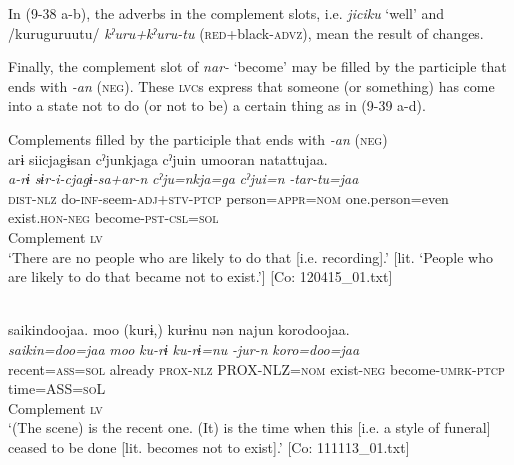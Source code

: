In (9-38 a-b), the adverbs in the complement slots, i.e. \textit{jiciku} ‘well’ and /kuruguruutu/ \textit{kˀuru+kˀuru-tu} (\textsc{red}+black-\textsc{advz}), mean the result of changes.

Finally, the complement slot of \textit{nar-} ‘become’ may be filled by the participle that ends with \textit{{}-an} (\textsc{neg}). These \textsc{lvc}s express that someone (or something) has come into a state not to do (or not to be) a certain thing as in (9-39 a-d).

\ea   Complements filled by the participle that ends with \textit{{}-an} (\textsc{neg}) \label{ex:9.39}
 \ea{}\\
    \gllll  arɨ  siicjagɨsan  cˀjunkjaga   cˀjuin  umooran  natattujaa.\\
      \textit{a-rɨ}  \textit{sɨr-i-cjagɨ-sa+ar-n}  \textit{cˀju=nkja=ga} \textit{cˀjui=n}  \textit{}  \textit{-tar-tu=jaa}\\
      \textsc{dist}-\textsc{nlz}  do-\textsc{inf}-seem-\textsc{adj}+\textsc{stv}-\textsc{ptcp}  person=\textsc{appr}=\textsc{nom}  one.person=even  exist.\textsc{hon}-\textsc{neg}  become-\textsc{pst}-\textsc{csl}=\textsc{sol}\\
          {}           {}       {}             {}       Complement  \textsc{lv}\\
      \glt       ‘There are no people who are likely to do that [i.e. recording].’ [lit. ‘People who are likely to do that became not to exist.’] [Co: 120415\_01.txt]

  \ex{}\\
    \gllll {\textbar}saikin{\textbar}doojaa.  {\textbar}moo{\textbar}  (kurɨ,)  kurɨnu  nən  najun  {\textbar}koro{\textbar}doojaa.\\
      \textit{saikin=doo=jaa}  \textit{moo}  \textit{ku-rɨ}  \textit{ku-rɨ=nu}  \textit{}  \textit{-jur-n}  \textit{koro=doo=jaa}\\
      recent=\textsc{ass}=\textsc{sol}  already  \textsc{prox}-\textsc{nlz}  PROX-NLZ=\textsc{nom}  exist-\textsc{neg}  become-\textsc{umrk}-\textsc{ptcp}  time=ASS=\textsc{so}L\\
          {}             {}        {}          {}          Complement  \textsc{lv} \\
      \glt ‘(The scene) is the recent one. (It) is the time when this [i.e. a style of funeral] ceased to be done [lit. becomes not to exist].’   [Co: 111113\_01.txt]

